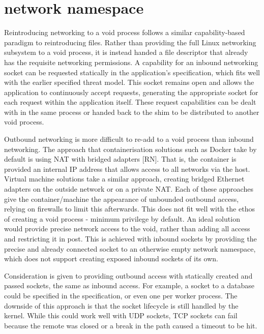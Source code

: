 \documentclass[12pt,a4paper,twoside]{report}
\begin{document}
\section{network namespace}
\label{sec:filling-net}

Reintroducing networking to a void process follows a similar capability-based paradigm to reintroducing files. Rather than providing the full Linux networking subsystem to a void process, it is instead handed a file descriptor that already has the requisite networking permissions. A capability for an inbound networking socket can be requested statically in the application's specification, which fits well with the earlier specified threat model. This socket remains open and allows the application to continuously accept requests, generating the appropriate socket for each request within the application itself. These request capabilities can be dealt with in the same process or handed back to the shim to be distributed to another void process.

Outbound networking is more difficult to re-add to a void process than inbound networking. The approach that containerisation solutions such as Docker take by default is using NAT with bridged adapters [RN]. That is, the container is provided an internal IP address that allows access to all networks via the host. Virtual machine solutions take a similar approach, creating bridged Ethernet adapters on the outside network or on a private NAT. Each of these approaches give the container/machine the appearance of unbounded outbound access, relying on firewalls to limit this afterwards. This does not fit well with the ethos of creating a void process - minimum privilege by default. An ideal solution would provide precise network access to the void, rather than adding all access and restricting it in post. This is achieved with inbound sockets by providing the precise and already connected socket to an otherwise empty network namespace, which does not support creating exposed inbound sockets of its own.

Consideration is given to providing outbound access with statically created and passed sockets, the same as inbound access. For example, a socket to a database could be specified in the specification, or even one per worker process. The downside of this approach is that the socket lifecycle is still handled by the kernel. While this could work well with UDP sockets, TCP sockets can fail because the remote was closed or a break in the path caused a timeout to be hit.
\end{document}
